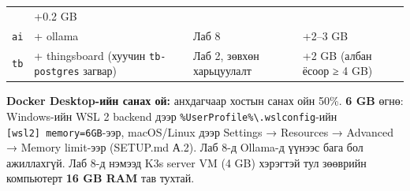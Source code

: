 \begin{longtable}[]{@{}llll@{}}
\begin{minipage}[t]{0.22\columnwidth}
\end{minipage} & \begin{minipage}[t]{0.22\columnwidth}\raggedright
+0.2 GB\strut
\end{minipage}\tabularnewline
\begin{minipage}[t]{0.22\columnwidth}\raggedright
\texttt{ai}\strut
\end{minipage} & \begin{minipage}[t]{0.22\columnwidth}\raggedright
+ ollama\strut
\end{minipage} & \begin{minipage}[t]{0.22\columnwidth}\raggedright
Лаб 8\strut
\end{minipage} & \begin{minipage}[t]{0.22\columnwidth}\raggedright
+2--3 GB\strut
\end{minipage}\tabularnewline
\begin{minipage}[t]{0.22\columnwidth}\raggedright
\texttt{tb}\strut
\end{minipage} & \begin{minipage}[t]{0.22\columnwidth}\raggedright
+ thingsboard (хуучин \texttt{tb-postgres} загвар)\strut
\end{minipage} & \begin{minipage}[t]{0.22\columnwidth}\raggedright
Лаб 2, зөвхөн харьцуулалт\strut
\end{minipage} & \begin{minipage}[t]{0.22\columnwidth}\raggedright
+2 GB (албан ёсоор ≥ 4 GB)\strut
\end{minipage}\tabularnewline
\bottomrule
\end{longtable}\endgroup

\begin{Shaded}
\begin{Highlighting}[]
\end{Highlighting}
\end{Shaded}

\textbf{Docker Desktop-ийн санах ой:} анхдагчаар хостын санах ойн 50\%. \textbf{6 GB} өгнө: Windows-ийн WSL 2 backend дээр \texttt{\%UserProfile\%\textbackslash{}\allowbreak{}.\allowbreak{}wslconfig}-ийн \texttt{{[}wsl2{]}\ memory=\allowbreak{}6GB}-ээр, macOS/Linux дээр Settings → Resources → Advanced → Memory limit-ээр (SETUP.md А.2). Лаб 8-д Ollama-д үүнээс бага бол ажиллахгүй. Лаб 8-д нэмээд K3s server VM (4 GB) хэрэгтэй тул зөөврийн компьютерт \textbf{16 GB RAM} тав тухтай.

